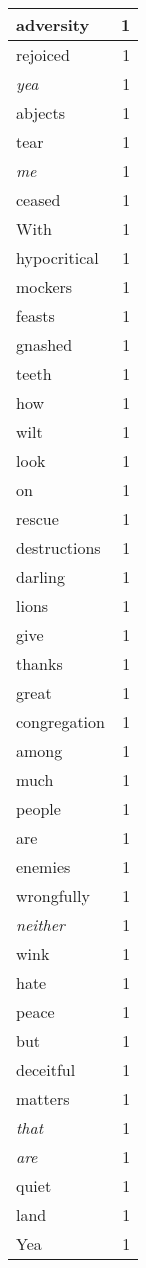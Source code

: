 \begin{center}
\begin{longtable}{l|r}
adversity & 1 \\ \hline
rejoiced & 1 \\ \hline
\emph{yea} & 1 \\ \hline
abjects & 1 \\ \hline
tear & 1 \\ \hline
\emph{me} & 1 \\ \hline
ceased & 1 \\ \hline
With & 1 \\ \hline
hypocritical & 1 \\ \hline
mockers & 1 \\ \hline
feasts & 1 \\ \hline
gnashed & 1 \\ \hline
teeth & 1 \\ \hline
how & 1 \\ \hline
wilt & 1 \\ \hline
look & 1 \\ \hline
on & 1 \\ \hline
rescue & 1 \\ \hline
destructions & 1 \\ \hline
darling & 1 \\ \hline
lions & 1 \\ \hline
give & 1 \\ \hline
thanks & 1 \\ \hline
great & 1 \\ \hline
congregation & 1 \\ \hline
among & 1 \\ \hline
much & 1 \\ \hline
people & 1 \\ \hline
are & 1 \\ \hline
enemies & 1 \\ \hline
wrongfully & 1 \\ \hline
\emph{neither} & 1 \\ \hline
wink & 1 \\ \hline
hate & 1 \\ \hline
peace & 1 \\ \hline
but & 1 \\ \hline
deceitful & 1 \\ \hline
matters & 1 \\ \hline
\emph{that} & 1 \\ \hline
\emph{are} & 1 \\ \hline
quiet & 1 \\ \hline
land & 1 \\ \hline
Yea & 1 \\ \hline

\end{longtable}
\end{center}
